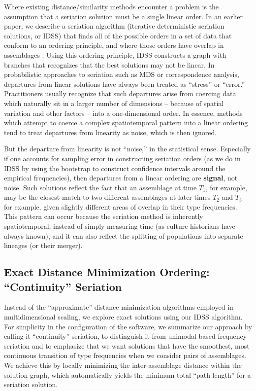 \documentclass[graybox,natbib]{svmult}
\begin{document}
Where existing distance/similarity methods encounter a problem is the
assumption that a seriation solution must be a single linear order. In
an earlier paper, we describe a seriation algorithm (iterative
deterministic seriation solutions, or IDSS) that finds all of the
possible orders in a set of data that conform to an ordering principle,
and where those orders have overlap in assemblages
\citep{lipomadsendunnell2015}. Using this ordering principle, IDSS
constructs a graph with branches that recognizes that the best solutions
may not be linear. In probabilistic approaches to seriation such as MDS
or correspondence analysis, departures from linear solutions have always
been treated as ``stress'' or ``error.'' Practitioners usually recognize
that such departures arise from coercing data which naturally sit in a
larger number of dimensions -- because of spatial variation and other
factors -- into a one-dimensional order. In essence, methods which
attempt to coerce a complex spatiotemporal pattern into a linear
ordering tend to treat departures from linearity as noise, which is then
ignored.

But the departure from linearity is not ``noise,'' in the statistical
sense. Especially if one accounts for sampling error in constructing
seriation orders (as we do in IDSS by using the bootstrap to construct
confidence intervals around the empirical frequencies), then departures
from a linear ordering are \textbf{signal}, not noise. Such solutions
reflect the fact that an assemblage at time \(T_1\), for example, may be
the closest match to two different assemblages at later times \(T_2\)
and \(T_3\) for example, given slightly different areas of overlap in
their type frequencies. This pattern can occur because the seriation
method is inherently spatiotemporal, instead of simply measuring time
(as culture historians have always known), and it can also reflect the
splitting of populations into separate lineages (or their merger).

\subsection{\texorpdfstring{Exact Distance Minimization Ordering:
``Continuity''
Seriation}{Exact Distance Minimization Ordering: Continuity Seriation}}\label{exact-distance-minimization-ordering-continuity-seriation}

Instead of the ``approximate'' distance minimization algorithms employed
in multidimensional scaling, we explore exact solutions using our IDSS
algorithm. For simplicity in the configuration of the software, we
summarize our approach by calling it ``continuity'' seriation, to
distinguish it from unimodal-based frequency seriation and to emphasize
that we want solutions that have the smoothest, most continuous
transition of type frequencies when we consider pairs of assemblages. We
achieve this by locally minimizing the inter-assemblage distance within
the solution graph, which automatically yields the minimum total ``path
length'' for a seriation solution.
\end{document}
